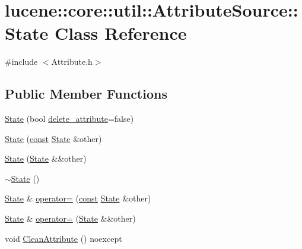 \hypertarget{classlucene_1_1core_1_1util_1_1AttributeSource_1_1State}{}\section{lucene\+:\+:core\+:\+:util\+:\+:Attribute\+Source\+:\+:State Class Reference}
\label{classlucene_1_1core_1_1util_1_1AttributeSource_1_1State}


{\ttfamily \#include $<$Attribute.\+h$>$}

\subsection*{Public Member Functions}
\begin{DoxyCompactItemize}
\item 
\mbox{\hyperlink{classlucene_1_1core_1_1util_1_1AttributeSource_1_1State_a0a7ca16cd4c6897ed68f26ab0c5fbd98}{State}} (bool \mbox{\hyperlink{classlucene_1_1core_1_1util_1_1AttributeSource_1_1State_a295bd737041155f73ff62277a6937926}{delete\+\_\+attribute}}=false)
\item 
\mbox{\hyperlink{classlucene_1_1core_1_1util_1_1AttributeSource_1_1State_a79a00eace2edc19b09e909936623f876}{State}} (\mbox{\hyperlink{ZlibCrc32_8h_a2c212835823e3c54a8ab6d95c652660e}{const}} \mbox{\hyperlink{classlucene_1_1core_1_1util_1_1AttributeSource_1_1State}{State}} \&other)
\item 
\mbox{\hyperlink{classlucene_1_1core_1_1util_1_1AttributeSource_1_1State_a8120f3909d194b9d892eeb3c2556cd72}{State}} (\mbox{\hyperlink{classlucene_1_1core_1_1util_1_1AttributeSource_1_1State}{State}} \&\&other)
\item 
\mbox{\hyperlink{classlucene_1_1core_1_1util_1_1AttributeSource_1_1State_a3a05101886b2a6734ded49d37fa149c2}{$\sim$\+State}} ()
\item 
\mbox{\hyperlink{classlucene_1_1core_1_1util_1_1AttributeSource_1_1State}{State}} \& \mbox{\hyperlink{classlucene_1_1core_1_1util_1_1AttributeSource_1_1State_ad44d92b62baa1db8c52bf961cec57863}{operator=}} (\mbox{\hyperlink{ZlibCrc32_8h_a2c212835823e3c54a8ab6d95c652660e}{const}} \mbox{\hyperlink{classlucene_1_1core_1_1util_1_1AttributeSource_1_1State}{State}} \&other)
\item 
\mbox{\hyperlink{classlucene_1_1core_1_1util_1_1AttributeSource_1_1State}{State}} \& \mbox{\hyperlink{classlucene_1_1core_1_1util_1_1AttributeSource_1_1State_a836a42b767c7d71bd1fb4d18336d13f9}{operator=}} (\mbox{\hyperlink{classlucene_1_1core_1_1util_1_1AttributeSource_1_1State}{State}} \&\&other)
\item 
void \mbox{\hyperlink{classlucene_1_1core_1_1util_1_1AttributeSource_1_1State_aac9541c0dcefd6c907c9bddbed2eccba}{Clean\+Attribute}} () noexcept
\end{DoxyCompactItemize}

